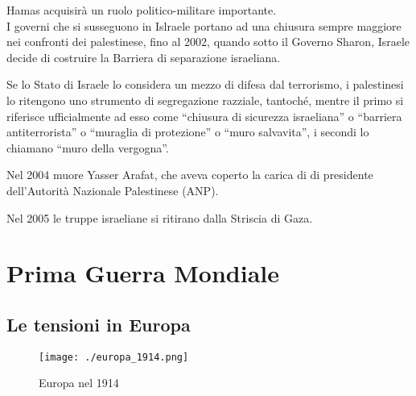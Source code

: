\documentclass[a4paper]{article}
\newcommand{\quotes}[1]{``#1''}
\begin{document}
Hamas acquisirà un ruolo politico-militare importante.
\\
I governi che si susseguono in Islraele portano ad una chiusura sempre maggiore
nei confronti dei palestinese, fino al 2002, quando sotto il Governo
Sharon, Israele decide di costruire la Barriera di separazione israeliana.


Se lo Stato di Israele lo considera un mezzo di difesa dal terrorismo,
i palestinesi lo ritengono uno strumento di segregazione razziale,
tantoché, mentre il primo si riferisce ufficialmente ad esso come
\quotes{chiusura di sicurezza israeliana} o \quotes{barriera antiterrorista} o
\quotes{muraglia di protezione} o \quotes{muro salvavita},
i secondi lo chiamano \quotes{muro della vergogna}.

Nel 2004 muore Yasser Arafat, che aveva coperto la carica di
di presidente dell'Autorità Nazionale Palestinese (ANP).

Nel 2005 le truppe israeliane si ritirano dalla Striscia di Gaza.

\pagebreak

\section{Prima Guerra Mondiale}


\subsection{Le tensioni in Europa}

\begin{center}
\begin{figure}[th]
    \centering
    \texttt{[image: ./europa\_1914.png]}
    \caption{Europa nel 1914}
\end{figure}
\end{center}
\end{document}
